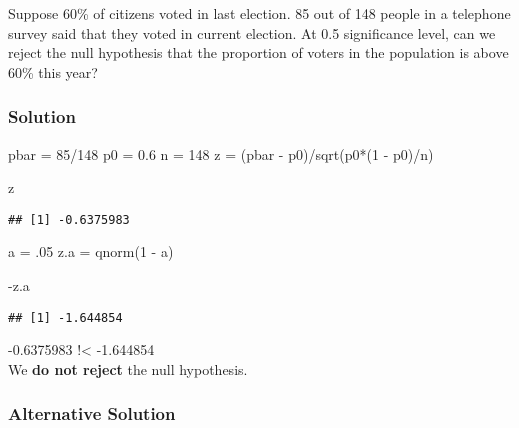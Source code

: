 \documentclass[
]{article}
\newenvironment{Shaded}{\begin{snugshade}}{\end{snugshade}}
\newcommand{\DecValTok}[1]{\textcolor[rgb]{0.00,0.00,0.81}{#1}}
\newcommand{\FloatTok}[1]{\textcolor[rgb]{0.00,0.00,0.81}{#1}}
\newcommand{\FunctionTok}[1]{\textcolor[rgb]{0.00,0.00,0.00}{#1}}
\newcommand{\NormalTok}[1]{#1}
\newcommand{\OtherTok}[1]{\textcolor[rgb]{0.56,0.35,0.01}{#1}}
\newcommand{\SpecialCharTok}[1]{\textcolor[rgb]{0.00,0.00,0.00}{#1}}
\begin{document}
Suppose 60\% of citizens voted in last election. 85 out of 148 people in
a telephone survey said that they voted in current election. At 0.5
significance level, can we reject the null hypothesis that the
proportion of voters in the population is above 60\% this year?

\hypertarget{solution-18}{%
\subsubsection{Solution}\label{solution-18}}

\begin{Shaded}
\begin{Highlighting}[]
\NormalTok{pbar }\OtherTok{=} \DecValTok{85}\SpecialCharTok{/}\DecValTok{148}
\NormalTok{p0 }\OtherTok{=} \FloatTok{0.6}
\NormalTok{n }\OtherTok{=} \DecValTok{148}
\NormalTok{z }\OtherTok{=}\NormalTok{ (pbar }\SpecialCharTok{{-}}\NormalTok{ p0)}\SpecialCharTok{/}\FunctionTok{sqrt}\NormalTok{(p0}\SpecialCharTok{*}\NormalTok{(}\DecValTok{1} \SpecialCharTok{{-}}\NormalTok{ p0)}\SpecialCharTok{/}\NormalTok{n)}

\NormalTok{z}
\end{Highlighting}
\end{Shaded}

\begin{verbatim}
## [1] -0.6375983
\end{verbatim}

\begin{Shaded}
\begin{Highlighting}[]
\NormalTok{a }\OtherTok{=}\NormalTok{ .}\DecValTok{05}
\NormalTok{z.a }\OtherTok{=} \FunctionTok{qnorm}\NormalTok{(}\DecValTok{1} \SpecialCharTok{{-}}\NormalTok{ a)}

\SpecialCharTok{{-}}\NormalTok{z.a}
\end{Highlighting}
\end{Shaded}

\begin{verbatim}
## [1] -1.644854
\end{verbatim}

-0.6375983 !\textless{} -1.644854\\
We \textbf{do not reject} the null hypothesis.

\hypertarget{alternative-solution}{%
\subsubsection{Alternative Solution}\label{alternative-solution}}
\end{document}
